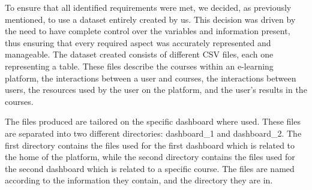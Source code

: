 To ensure that all identified requirements were met, we decided, 
as previously mentioned, to use a dataset entirely created by us. This decision was driven by the need to have 
complete control over the variables and information present, thus ensuring that every required aspect was 
accurately represented and manageable. The dataset created consists of different CSV files, each one representing a table. 
These files describe the courses within an e-learning platform, the interactions between a user and courses,
the interactions between users, the resources used by the user on the platform, and the user's
results in the courses.

The files produced are tailored on the specific dashboard where used. These files are separated into two different
directories: dashboard\_1 and dashboard\_2. The first directory contains the files used for the first dashboard which is
related to the home of the platform, while the second directory contains the files used for the second dashboard which is
related to a specific course. The files are named according to the information they contain, and the directory they are in.


